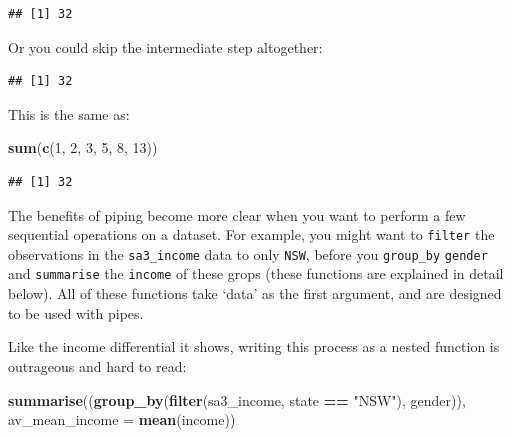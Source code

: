 \documentclass[]{book}
\newenvironment{Shaded}{\begin{snugshade}}{\end{snugshade}}
\newcommand{\DataTypeTok}[1]{\textcolor[rgb]{0.13,0.29,0.53}{#1}}
\newcommand{\DecValTok}[1]{\textcolor[rgb]{0.00,0.00,0.81}{#1}}
\newcommand{\KeywordTok}[1]{\textcolor[rgb]{0.13,0.29,0.53}{\textbf{#1}}}
\newcommand{\NormalTok}[1]{#1}
\newcommand{\OperatorTok}[1]{\textcolor[rgb]{0.81,0.36,0.00}{\textbf{#1}}}
\newcommand{\StringTok}[1]{\textcolor[rgb]{0.31,0.60,0.02}{#1}}
\begin{document}
\begin{verbatim}
## [1] 32
\end{verbatim}

Or you could skip the intermediate step altogether:

\begin{Shaded}
\end{Shaded}

\begin{verbatim}
## [1] 32
\end{verbatim}

This is the same as:

\begin{Shaded}
\begin{Highlighting}[]
\KeywordTok{sum}\NormalTok{(}\KeywordTok{c}\NormalTok{(}\DecValTok{1}\NormalTok{, }\DecValTok{2}\NormalTok{, }\DecValTok{3}\NormalTok{, }\DecValTok{5}\NormalTok{, }\DecValTok{8}\NormalTok{, }\DecValTok{13}\NormalTok{))}
\end{Highlighting}
\end{Shaded}

\begin{verbatim}
## [1] 32
\end{verbatim}

The benefits of piping become more clear when you want to perform a few sequential operations on a dataset. For example, you might want to \texttt{filter} the observations in the \texttt{sa3\_income} data to only \texttt{NSW}, before you \texttt{group\_by} \texttt{gender} and \texttt{summarise} the \texttt{income} of these grops (these functions are explained in detail below). All of these functions take `data' as the first argument, and are designed to be used with pipes.

Like the income differential it shows, writing this process as a nested function is outrageous and hard to read:

\begin{Shaded}
\begin{Highlighting}[]
\KeywordTok{summarise}\NormalTok{((}\KeywordTok{group_by}\NormalTok{(}\KeywordTok{filter}\NormalTok{(sa3_income, state }\OperatorTok{==}\StringTok{ "NSW"}\NormalTok{), gender)), }\DataTypeTok{av_mean_income =} \KeywordTok{mean}\NormalTok{(income))}
\end{Highlighting}
\end{Shaded}
\end{document}
